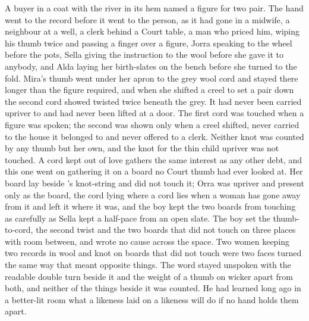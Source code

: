 A buyer in a coat with the river in its hem named a figure for two pair. The hand went to the record before it went to the person, as it had gone in a midwife, a neighbour at a well, a clerk behind a Court table, a man who priced him,  wiping his thumb twice and passing a finger over a figure, Jorra speaking to the wheel before the pots, Sella giving the instruction to the wool before she gave it to anybody, and Alda laying her birth-slates on the bench before she turned to the fold. Mira's thumb went under her apron to the grey wool cord and stayed there longer than the figure required, and when she shifted a creel to set a pair down the second cord showed twisted twice beneath the grey. It had never been carried upriver to  and had never been lifted at a door. The first cord was touched when a figure was spoken; the second was shown only when a creel shifted, never carried to the house it belonged to and never offered to a clerk. Neither knot was counted by any thumb but her own, and the knot for the thin child upriver was not touched. A cord kept out of love gathers the same interest as any other debt, and this one went on gathering it on a board no Court thumb had ever looked at. Her board lay beside 's knot-string and did not touch it; Orra was upriver and present only as the board, the cord lying where a cord lies when a woman has gone away from it and left it where it was, and the boy kept the two boards from touching as carefully as Sella kept a half-pace from an open slate. The boy set the thumb-to-cord, the second twist and the two boards that did not touch on three places with room between, and wrote no cause across the space. Two women keeping two records in wool and knot on boards that did not touch were two faces turned the same way that meant opposite things. The word stayed unspoken with the readable double turn beside it and the weight of a thumb on wicker apart from both, and neither of the things beside it was counted. He had learned long ago in a better-lit room what a likeness laid on a likeness will do if no hand holds them apart.

\scenebreak

